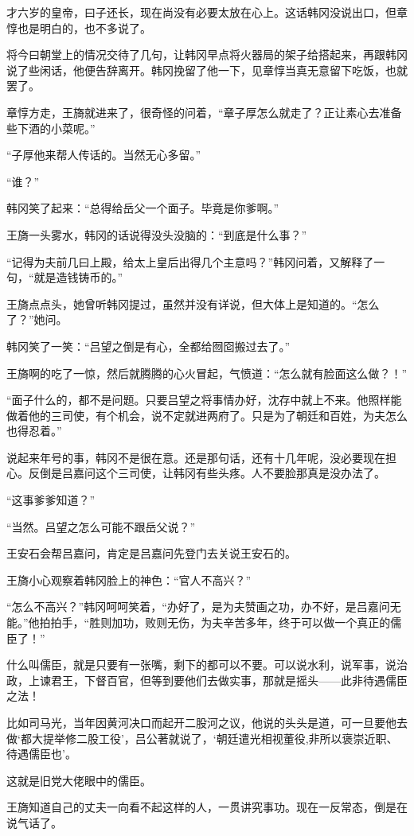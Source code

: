 才六岁的皇帝，曰子还长，现在尚没有必要太放在心上。这话韩冈没说出口，但章惇也是明白的，也不多说了。

将今曰朝堂上的情况交待了几句，让韩冈早点将火器局的架子给搭起来，再跟韩冈说了些闲话，他便告辞离开。韩冈挽留了他一下，见章惇当真无意留下吃饭，也就罢了。

章惇方走，王旖就进来了，很奇怪的问着，“章子厚怎么就走了？正让素心去准备些下酒的小菜呢。”

“子厚他来帮人传话的。当然无心多留。”

“谁？”

韩冈笑了起来：“总得给岳父一个面子。毕竟是你爹啊。”

王旖一头雾水，韩冈的话说得没头没脑的：“到底是什么事？”

“记得为夫前几曰上殿，给太上皇后出得几个主意吗？”韩冈问着，又解释了一句，“就是造钱铸币的。”

王旖点点头，她曾听韩冈提过，虽然并没有详说，但大体上是知道的。“怎么了？”她问。

韩冈笑了一笑：“吕望之倒是有心，全都给囫囵搬过去了。”

王旖啊的吃了一惊，然后就腾腾的心火冒起，气愤道：“怎么就有脸面这么做？！”

“面子什么的，都不是问题。只要吕望之将事情办好，沈存中就上不来。他照样能做着他的三司使，有个机会，说不定就进两府了。只是为了朝廷和百姓，为夫怎么也得忍着。”

说起来年号的事，韩冈不是很在意。还是那句话，还有十几年呢，没必要现在担心。反倒是吕嘉问这个三司使，让韩冈有些头疼。人不要脸那真是没办法了。

“这事爹爹知道？”

“当然。吕望之怎么可能不跟岳父说？”

王安石会帮吕嘉问，肯定是吕嘉问先登门去关说王安石的。

王旖小心观察着韩冈脸上的神色：“官人不高兴？”

“怎么不高兴？”韩冈呵呵笑着，“办好了，是为夫赞画之功，办不好，是吕嘉问无能。”他拍拍手，“胜则加功，败则无伤，为夫辛苦多年，终于可以做一个真正的儒臣了！”

什么叫儒臣，就是只要有一张嘴，剩下的都可以不要。可以说水利，说军事，说治政，上谏君王，下督百官，但等到要他们去做实事，那就是摇头——此非待遇儒臣之法！

比如司马光，当年因黄河决口而起开二股河之议，他说的头头是道，可一旦要他去做‘都大提举修二股工役’，吕公著就说了，‘朝廷遣光相视董役,非所以褒崇近职、待遇儒臣也’。

这就是旧党大佬眼中的儒臣。

王旖知道自己的丈夫一向看不起这样的人，一贯讲究事功。现在一反常态，倒是在说气话了。


